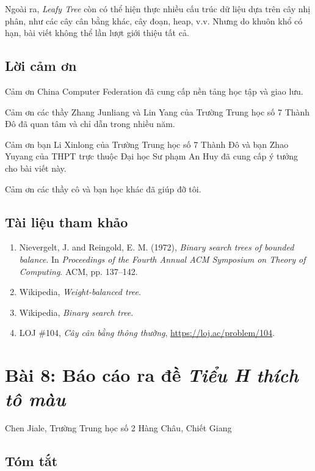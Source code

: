\documentclass[11pt]{article}
\begin{document}
Ngoài ra, \emph{Leafy Tree} còn có thể hiện thực nhiều cấu trúc dữ liệu dựa
trên cây nhị phân, như các cây cân bằng khác, cây đoạn, heap, v.v. Nhưng do
khuôn khổ có hạn, bài viết không thể lần lượt giới thiệu tất cả.

\subsection*{Lời cảm ơn}

Cảm ơn China Computer Federation đã cung cấp nền tảng học tập và giao lưu.

Cảm ơn các thầy Zhang Junliang và Lin Yang của Trường Trung học số 7 Thành Đô
đã quan tâm và chỉ dẫn trong nhiều năm.

Cảm ơn bạn Li Xinlong của Trường Trung học số 7 Thành Đô và bạn Zhao Yuyang của
THPT trực thuộc Đại học Sư phạm An Huy đã cung cấp ý tưởng cho bài viết này.

Cảm ơn các thầy cô và bạn học khác đã giúp đỡ tôi.

\subsection*{Tài liệu tham khảo}

\begin{enumerate}
  \item Nievergelt, J. and Reingold, E. M. (1972), \emph{Binary search trees of
  bounded balance}. In \emph{Proceedings of the Fourth Annual ACM Symposium on
  Theory of Computing}. ACM, pp. 137--142.
  \item Wikipedia, \emph{Weight-balanced tree}.
  \item Wikipedia, \emph{Binary search tree}.
  \item LOJ \#104, \emph{Cây cân bằng thông thường},
  \url{https://loj.ac/problem/104}.
\end{enumerate}

\section{Bài 8: Báo cáo ra đề \emph{Tiểu H thích tô màu}}

\begin{center}
Chen Jiale, Trường Trung học số 2 Hàng Châu, Chiết Giang
\end{center}

\subsection*{Tóm tắt}
\end{document}
